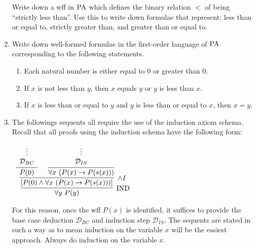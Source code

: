 \documentclass[11pt]{report}
\begin{document}
\begin{enumerate}
	Write down a wff in $\text{PA}$ which defines the binary relation $<$ of being ``strictly less than''. Use this to write down formulae that represent: less than or equal to, strictly greater than, and greater than or equal to. 


	\item Write down well-formed formulae in the first-order language of $\text{PA}$ corresponding to the following statements. 
	
	\begin{enumerate}
		\item Each natural number is either equal to $0$ or greater than $0$. 			
		\item If $x$ is not less than $y$, then $x$ equals $y$ or $y$ is less than $x$.
		\item If $x$ is less than or equal to $y$ and $y$ is less than or equal to $x$, then $x=y$. 
	\end{enumerate} 

	\newpage
	\item The followings sequents all require the use of the induction axiom schema. Recall that all proofs using the induction schema have the following form: 
	
		\begin{mdframed}
			\begin{center}
				$\begin{array}{c}
					\infer[\IND]{\forall y \ P(y)}
						{\infer[\land I]{[P(0) \land \forall x \ (P(x) \to P(s(x)))]}
							{\infer[]{P(0)}{\begin{array}{c} \vdots \\ \mathcal{D}_{BC}\end{array}}
							&
							\infer[]{\forall x \ (P(x) \to P(s(x)))}
								{\begin{array}{c} \vdots \\ \mathcal{D}_{IS}\end{array}}}}
				\end{array}$
			\end{center}
		\end{mdframed}

	For this reason, once the wff $P(x)$ is identified, it suffices to provide the base case deduction $\mathcal{D}_{BC}$ and induction step $\mathcal{D}_{IS}$. The sequents are stated in such a way as to mean induction on the variable $x$ will be the easiest approach. Always do induction on the variable $x$.  
	

\end{enumerate}
\end{document}
